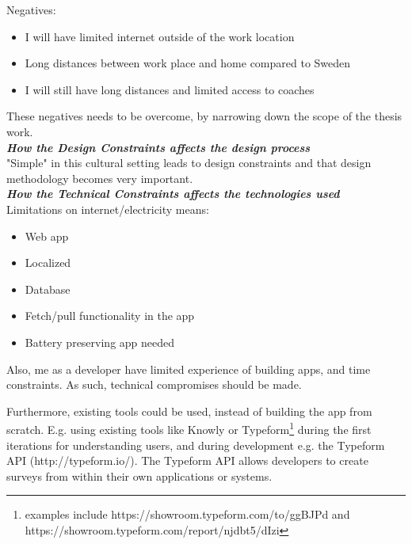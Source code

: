 Negatives:
\begin{itemize}
    \item I will have limited internet outside of the work location
    \item Long distances between work place and home compared to Sweden
    \item I will still have long distances and limited access to coaches\\
\end{itemize}

These negatives needs to be overcome, by narrowing down the scope of the thesis work. \\

\textbf{\textit{How the Design Constraints affects the design process}}\\
"Simple" in this cultural setting leads to design constraints and that design methodology becomes very important.\\

\textbf{\textit{How the Technical Constraints affects the technologies used}}\\
Limitations on internet/electricity means:

\begin{itemize}
    \item Web app
    \item Localized
    \item Database
    \item Fetch/pull functionality in the app
    \item Battery preserving app needed
\end{itemize}

Also, me as a developer have limited experience of building apps, and time constraints. As such, technical compromises should be made.

Furthermore, existing tools could be used, instead of building the app from scratch. E.g. using existing tools like Knowly or Typeform\footnote{examples include https://showroom.typeform.com/to/ggBJPd and https://showroom.typeform.com/report/njdbt5/dIzi} during the first iterations for understanding users, and during development e.g. the Typeform API (http://typeform.io/). The Typeform API allows developers to create surveys from within their own applications or systems. \\
